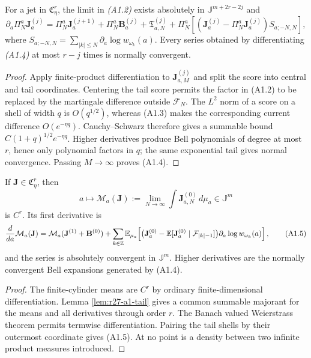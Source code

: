 \begin{lemma}
\label{lem:r27-a1-tail}
For a jet in $\mathfrak C_\eta^r$, the limit in \emph{(A1.2)} exists
absolutely in $\mathbb J^{m+2r-2j}$ and
\[
 \partial_a\Pi_N^a\mathbf J_a^{(j)}
 =\Pi_N^a\mathbf J_a^{(j+1)}
  +\Pi_N^a\mathbf B_a^{(j)}
  +\mathfrak T^{(j)}_{a,N}
  +\Pi_N^a\!\left[
     (\mathbf J_a^{(j)}-\Pi_N^a\mathbf J_a^{(j)})
     S_{a;-N,N}\right],                                  \tag{A1.4}
\]
where $S_{a;-N,N}=\sum_{|k|\le N}\partial_a\log w_{\omega_k}(a)$.
Every series obtained by differentiating \emph{(A1.4)} at most $r-j$ times is
normally convergent.
\end{lemma}

\begin{proof}
Apply finite-product differentiation to $\mathbf J^{(j)}_{a,M}$ and split the
score into central and tail coordinates.  Centering the tail score permits
the factor in (A1.2) to be replaced by the martingale difference outside
$\mathcal F_N$.  The $L^2$ norm of a score on a shell of width $q$ is
$O(q^{1/2})$, whereas (A1.3) makes the corresponding current difference
$O(e^{-\eta q})$.  Cauchy--Schwarz therefore gives a summable bound
$C(1+q)^{1/2}e^{-\eta q}$.  Higher derivatives produce Bell polynomials of
degree at most $r$, hence only polynomial factors in $q$; the same exponential
tail gives normal convergence.  Passing $M\to\infty$ proves (A1.4).
\end{proof}

\begin{theorem}
\label{thm:r27-a1-response}
If $\mathbf J\in\mathfrak C_\eta^r$, then
\[
 a\longmapsto \mathcal M_a(\mathbf J)
 :=\lim_{N\to\infty}\int\mathbf J^{(0)}_{a,N}\,d\mu_a
 \in\mathbb J^{m}
\]
is $C^r$.  Its first derivative is
\[
 {d\over da}\mathcal M_a(\mathbf J)
 =\mathcal M_a(\mathbf J^{(1)}+\mathbf B^{(0)})
 +\sum_{k\in\mathbb Z}
 \mathbb E_{\mu_a}\!\left[
  \bigl(\mathbf J_a^{(0)}
       -\mathbb E[\mathbf J_a^{(0)}\mid\mathcal F_{|k|-1}]\bigr)
  \partial_a\log w_{\omega_k}(a)\right],                 \tag{A1.5}
\]
and the series is absolutely convergent in $\mathbb J^m$.  Higher derivatives
are the normally convergent Bell expansions generated by (A1.4).
\end{theorem}

\begin{proof}
The finite-cylinder means are $C^r$ by ordinary finite-dimensional
differentiation.  Lemma \ref{lem:r27-a1-tail} gives a common summable
majorant for the means and all derivatives through order $r$.  The Banach
valued Weierstrass theorem permits termwise differentiation.  Pairing the
tail shells by their outermost coordinate gives (A1.5).  At no point is a
density between two infinite product measures introduced.
\end{proof}

